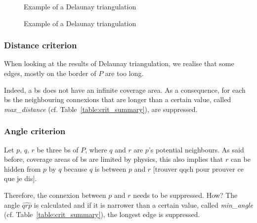 \documentclass[lettersize,journal,english]{IEEEtran}
\begin{document}
\begin{figure}[!b]
    \centering
    \caption{Example of a Delaunay triangulation}
    \label{fig:crit_qua}
\end{figure}

\begin{figure}[!t]
    \centering
    \caption{Example of a Delaunay triangulation}
    \label{fig:crit_nei}
\end{figure}

\subsubsection{Distance criterion}
When looking at the results of Delaunay triangulation, we realise that some edges, mostly on the border of $P$ are too long.

Indeed, a \acrshort{bs} does not have an infinite coverage area. As a consequence, for each \acrshort{bs} the neighbouring connexions that are longer than a certain value, called \emph{max\_distance} (cf. Table~\ref{table:crit_summary}), are suppressed.

\subsubsection{Angle criterion}
Let $p$, $q$, $r$ be three \acrshort{bs} of $P$, where $q$ and $r$ are $p$'s potential neighbours. As said before, coverage areas of \acrshort{bs} are limited by physics, this also implies that $r$ can be \og hidden\fg{} from $p$ by $q$ because $q$ is between $p$ and $r$ [trouver qqch pour prouver ce que je dis].

Therefore, the connexion between $p$ and $r$ needs to be suppressed. How? The angle $\widehat{qrp}$ is calculated and if it is narrower than a certain value, called \emph{min\_angle} (cf. Table~\ref{table:crit_summary}), the longest edge is suppressed.
\end{document}
